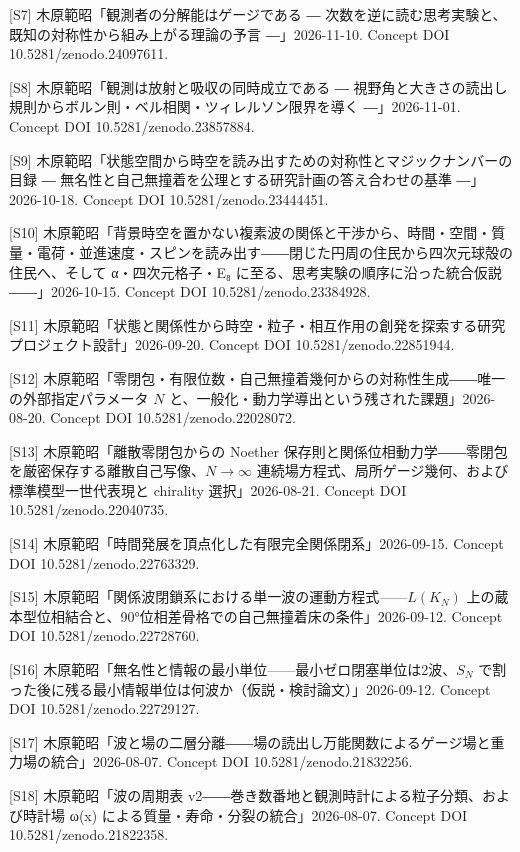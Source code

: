 \documentclass[
  a4paper,
]{ltjsarticle}
\begin{document}
{[}S7{]} 木原範昭「観測者の分解能はゲージである ―
次数を逆に読む思考実験と、既知の対称性から組み上がる理論の予言
―」2026-11-10. Concept DOI 10.5281/zenodo.24097611.

{[}S8{]} 木原範昭「観測は放射と吸収の同時成立である ―
視野角と大きさの読出し規則からボルン則・ベル相関・ツィレルソン限界を導く
―」2026-11-01. Concept DOI 10.5281/zenodo.23857884.

{[}S9{]}
木原範昭「状態空間から時空を読み出すための対称性とマジックナンバーの目録
― 無名性と自己無撞着を公理とする研究計画の答え合わせの基準
―」2026-10-18. Concept DOI 10.5281/zenodo.23444451.

{[}S10{]}
木原範昭「背景時空を置かない複素波の関係と干渉から、時間・空間・質量・電荷・並進速度・スピンを読み出す――閉じた円周の住民から四次元球殻の住民へ、そして
α・四次元格子・E₈ に至る、思考実験の順序に沿った統合仮説――」2026-10-15.
Concept DOI 10.5281/zenodo.23384928.

{[}S11{]}
木原範昭「状態と関係性から時空・粒子・相互作用の創発を探索する研究プロジェクト設計」2026-09-20.
Concept DOI 10.5281/zenodo.22851944.

{[}S12{]}
木原範昭「零閉包・有限位数・自己無撞着幾何からの対称性生成――唯一の外部指定パラメータ
\(N\) と、一般化・動力学導出という残された課題」2026-08-20. Concept DOI
10.5281/zenodo.22028072.

{[}S13{]} 木原範昭「離散零閉包からの Noether
保存則と関係位相動力学――零閉包を厳密保存する離散自己写像、\(N\to\infty\)
連続場方程式、局所ゲージ幾何、および標準模型一世代表現と chirality
選択」2026-08-21. Concept DOI 10.5281/zenodo.22040735.

{[}S14{]} 木原範昭「時間発展を頂点化した有限完全関係閉系」2026-09-15.
Concept DOI 10.5281/zenodo.22763329.

{[}S15{]}
木原範昭「関係波閉鎖系における単一波の運動方程式------\(L(K_N)\)
上の蔵本型位相結合と、90°位相差骨格での自己無撞着床の条件」2026-09-12.
Concept DOI 10.5281/zenodo.22728760.

{[}S16{]}
木原範昭「無名性と情報の最小単位------最小ゼロ閉塞単位は2波、\(S_N\)
で割った後に残る最小情報単位は何波か（仮説・検討論文）」2026-09-12.
Concept DOI 10.5281/zenodo.22729127.

{[}S17{]}
木原範昭「波と場の二層分離――場の読出し万能関数によるゲージ場と重力場の統合」2026-08-07.
Concept DOI 10.5281/zenodo.21832256.

{[}S18{]} 木原範昭「波の周期表
v2――巻き数番地と観測時計による粒子分類、および時計場 ω(x)
による質量・寿命・分裂の統合」2026-08-07. Concept DOI
10.5281/zenodo.21822358.
\end{document}
